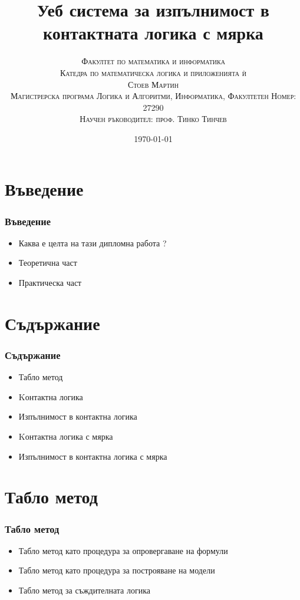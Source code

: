 \documentclass{beamer}
\begin{document}
\title{Уеб система за изпълнимост в контактната логика с мярка}  
\author{\textsc{Факултет по математика и информатика} \\
	\textsc{Катедра по математическа логика и приложенията ѝ} \\ [3mm]
	\textsc{Стоев Мартин} \\ [3mm]
	\textsc{Магистрерска програма Логика и Алгоритми, Информатика, Факултетен Номер: 27290} \\ [4mm]
	\small\textsc{Научен ръководител: проф. Тинко Тинчев}}
\date{\today} 
\begin{frame}
\titlepage
\end{frame}



\section{Въведение} 
\begin{frame}\frametitle{Въведение}
\begin{itemize}
	\item Каква е целта на тази дипломна работа ?
	\item Теоретична част
	\item Практическа част
\end{itemize}
\end{frame}

\section{Съдържание} 
\begin{frame}\frametitle{Съдържание}
\begin{itemize}
	\item Табло метод
	\item Kонтактна логика
	\item Изпълнимост в контактна логика
	\item Kонтактна логика с мярка
	\item Изпълнимост в контактна логика с мярка
\end{itemize}
\end{frame}

\section{Табло метод}
\begin{frame}\frametitle{Табло метод}
\begin{itemize}
	\item Табло метод като процедура за опровергаване на формули
	\item Табло метод като процедура за построяване на модели
	\item Табло метод за съждителната логика
\end{itemize}
\end{frame}
\end{document}
